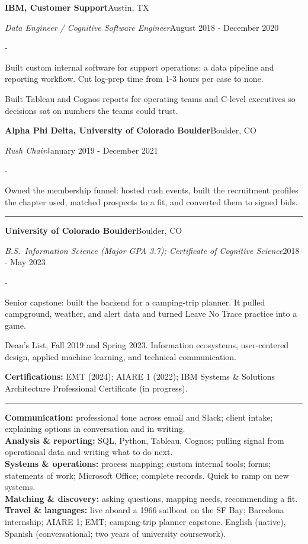 \documentclass[10pt,letterpaper]{article}
\newenvironment{cvitems}{%
  \begin{list}{-}{%
    \setlength{\leftmargin}{12pt}%
    \setlength{\itemsep}{1.2pt}%
    \setlength{\parsep}{0pt}%
    \setlength{\topsep}{1.5pt}%
    \setlength{\partopsep}{0pt}%
    \setlength{\labelwidth}{6pt}%
    \setlength{\labelsep}{6pt}%
    \setlength{\itemindent}{0pt}%
  }%
}{\end{list}}
\newcommand{\cvsection}[1]{%
  \vspace{7pt}%
  \noindent{\bfseries\fontsize{11pt}{13pt}\selectfont\MakeUppercase{#1}}\par
  \vspace{1pt}%
  \noindent\rule{\textwidth}{0.4pt}\par
  \vspace{4pt}%
}
\newcommand{\cventryhead}[4]{%
  \noindent\textbf{#1}\hfill#2\par
  \vspace{0.5pt}%
  \noindent\textit{#3}\hfill#4\par
}
\newcommand{\cveduhead}[4]{%
  \noindent\textbf{#1}\hfill#2\par
  \vspace{0.5pt}%
  \noindent\textit{#3}\hfill#4\par
}
\begin{document}
\vspace{5pt}
\cventryhead{IBM, Customer Support}{Austin, TX}
{Data Engineer / Cognitive Software Engineer}{August 2018 - December 2020}
\begin{cvitems}
  \item Built custom internal software for support operations: a data pipeline and reporting workflow. Cut log-prep time from 1-3 hours per case to none.
  \item Built Tableau and Cognos reports for operating teams and C-level executives so decisions sat on numbers the teams could trust.
\end{cvitems}

\vspace{5pt}
\cventryhead{Alpha Phi Delta, University of Colorado Boulder}{Boulder, CO}
{Rush Chair}{January 2019 - December 2021}
\begin{cvitems}
  \item Owned the membership funnel: hosted rush events, built the recruitment profiles the chapter used, matched prospects to a fit, and converted them to signed bids.
\end{cvitems}

\cvsection{Education}

\cveduhead{University of Colorado Boulder}{Boulder, CO}
{B.S.\ Information Science (Major GPA 3.7); Certificate of Cognitive Science}{2018 - May 2023}
\begin{cvitems}
  \item Senior capstone: built the backend for a camping-trip planner. It pulled campground, weather, and alert data and turned Leave No Trace practice into a game.
  \item Dean's List, Fall 2019 and Spring 2023. Information ecosystems, user-centered design, applied machine learning, and technical communication.
\end{cvitems}

\vspace{5pt}
\noindent\textbf{Certifications:} EMT (2024); AIARE 1 (2022); IBM Systems \& Solutions Architecture Professional Certificate (in progress).

\cvsection{Skills}

\noindent\textbf{Communication:} professional tone across email and Slack; client intake; explaining options in conversation and in writing.\\[2pt]
\noindent\textbf{Analysis \& reporting:} SQL, Python, Tableau, Cognos; pulling signal from operational data and writing what to do next.\\[2pt]
\noindent\textbf{Systems \& operations:} process mapping; custom internal tools; forms; statements of work; Microsoft Office; complete records. Quick to ramp on new systems.\\[2pt]
\noindent\textbf{Matching \& discovery:} asking questions, mapping needs, recommending a fit.\\[2pt]
\noindent\textbf{Travel \& languages:} live aboard a 1966 sailboat on the SF Bay; Barcelona internship; AIARE 1; EMT; camping-trip planner capstone. English (native), Spanish (conversational; two years of university coursework).
\end{document}
